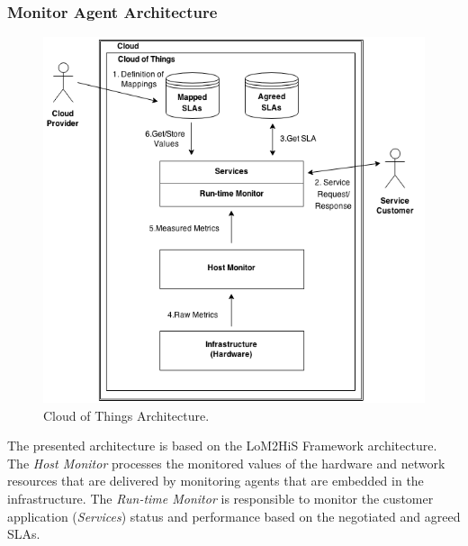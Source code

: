 \subsubsection{Monitor Agent Architecture}
\label{subs:monitoring_srchitecture}
\vspace{1in}
\begin{figure}[h!]
  \centering
  \includegraphics[width=.8\textwidth]{./images/cloud-of-things-architecture}
  \caption{Cloud of Things Architecture.}
  \label{fig:cloud_of_things_architecture}
\end{figure}
The presented architecture is based on the LoM2HiS Framework \cite{emeakaroha2010low} architecture. The
\textit{Host Monitor} processes the monitored values of the hardware and network resources that are delivered
by monitoring agents that are embedded in the infrastructure. The \textit{Run-time Monitor} is responsible to
monitor the customer application (\textit{Services}) status and performance based on the negotiated
and agreed SLAs.\\

